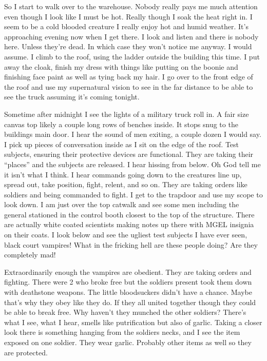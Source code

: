 So I start to walk over to the warehouse. Nobody really pays me much attention even though I look like I must be hot. Really though I soak the heat right in. I seem to be a cold blooded creature I really enjoy hot and humid weather. It's approaching evening now when I get there. I look and listen and there is nobody here. Unless they're dead. In which case they won't notice me anyway. I would assume. I climb to the roof, using the ladder outside the building this time. I put away the cloak, finish my dress with things like putting on the boonie and finishing face paint as well as tying back my hair. I go over to the front edge of the roof and use my supernatural vision to see in the far distance to be able to see the truck assuming it's coming tonight.

Sometime after midnight I see the lights of a military truck roll in. A fair size canvas top likely a couple long rows of benches inside. It stops snug to the buildings main door. I hear the sound of men exiting, a couple dozen I would say. I pick up pieces of conversation inside as I sit on the edge of the roof. Test subjects, ensuring their protective devices are functional. They are taking their ``places'' and the subjects are released. I hear hissing from below. Oh God tell me it isn't what I think. I hear commands going down to the creatures line up, spread out, take position, fight, relent, and so on. They are taking orders like soldiers and being commanded to fight. I get to the trapdoor and use my scope to look down. I am just over the top catwalk and see some men including the general stationed in the control booth closest to the top of the structure. There are actually white coated scientists making notes up there with MGEL insignia on their coats. I look below and see the ugliest test subjects I have ever seen, black court vampires! What in the fricking hell are these people doing? Are they completely mad!

Extraordinarily enough the vampires are obedient. They are taking orders and fighting. There were 2 who broke free but the soldiers present took them down with deathstone weapons. The little bloodsuckers didn't have a chance. Maybe that's why they obey like they do. If they all united together though they could be able to break free. Why haven't they munched the other soldiers? There's what I see, what I hear, smells like putrification but also of garlic. Taking a closer look there is something hanging from the soldiers necks, and I see the item exposed on one soldier. They wear garlic. Probably other items as well so they are protected.

